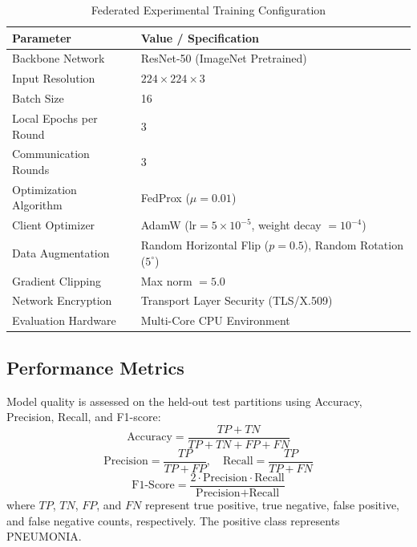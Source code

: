 \documentclass[journal]{IEEEtran}
\begin{document}
\begin{table}[h]
\centering
\caption{Federated Experimental Training Configuration}
\label{tab:hyperparameters}
\begin{tabular}{ll}
\toprule
\textbf{Parameter} & \textbf{Value / Specification} \\
\midrule
Backbone Network           & ResNet-50 (ImageNet Pretrained) \\
Input Resolution          & $224 \times 224 \times 3$ \\
Batch Size                & 16 \\
Local Epochs per Round    & 3 \\
Communication Rounds      & 3 \\
Optimization Algorithm    & FedProx ($\mu = 0.01$) \\
Client Optimizer          & AdamW ($\text{lr} = 5 \times 10^{-5}$, weight decay $= 10^{-4}$) \\
Data Augmentation         & Random Horizontal Flip ($p=0.5$), Random Rotation ($5^\circ$) \\
Gradient Clipping         & Max norm $= 5.0$ \\
Network Encryption        & Transport Layer Security (TLS/X.509) \\
Evaluation Hardware       & Multi-Core CPU Environment \\
\bottomrule
\end{tabular}
\end{table}

\subsection{Performance Metrics}
Model quality is assessed on the held-out test partitions using Accuracy, Precision, Recall, and F1-score:
\begin{equation}
\text{Accuracy} = \frac{TP + TN}{TP + TN + FP + FN}
\end{equation}
\begin{equation}
\text{Precision} = \frac{TP}{TP + FP}, \quad \text{Recall} = \frac{TP}{TP + FN}
\end{equation}
\begin{equation}
\text{F1-Score} = \frac{2 \cdot \text{Precision} \cdot \text{Recall}}{\text{Precision} + \text{Recall}}
\end{equation}
where $TP$, $TN$, $FP$, and $FN$ represent true positive, true negative, false positive, and false negative counts, respectively. The positive class represents PNEUMONIA.
\end{document}
